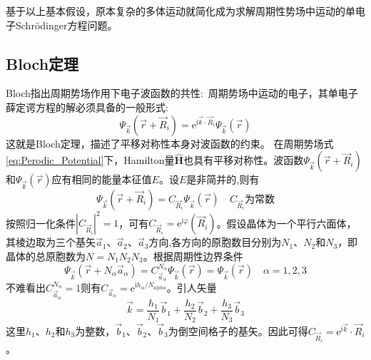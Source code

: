 基于以上基本假设，原本复杂的多体运动就简化成为求解周期性势场中运动的单电子Schr\"odinger方程问题。

\subsection{Bloch定理} 
Bloch指出\cite{ZP52-555_1928}周期势场作用下电子波函数的共性:~周期势场中运动的电子，其单电子薛定谔方程的解必须具备的一般形式:
\begin{equation}
	\Psi_{\vec k}(\vec r+\vec R_i)=\mathrm{e}^{\mathrm{i}\vec k\cdot\vec R_i}\Psi_{\vec k}(\vec r)
	\label{eq:Bloch_theorme}
\end{equation} 
这就是Bloch定理，描述了平移对称性本身对波函数的约束。%
在周期势场式\eqref{eq:Perodic_Potential}下，Hamilton量$\hat{\mathbf{H}}$也具有平移对称性。波函数$\Psi_{\vec k}(\vec r+\vec R_i)$和$\Psi_{\vec k}(\vec r)$应有相同的能量本征值$E$。设$E$是非简并的,则有
\begin{equation}
	\Psi_{\vec k}(\vec r+\vec R_i)=C_{\vec R_i}\Psi_{\vec k}(\vec r)\quad C_{\vec R_i}\mbox{为常数}
	\label{eq:Bloch_Theorme-1}
\end{equation}
按照归一化条件$|C_{\vec R_i}|^2=1$，可有$C_{\vec R_i}=\mathrm{e}^{\mathrm{i}\varphi}(\vec R_i)$。假设晶体为一个平行六面体，其棱边取为三个基矢$\vec a_1$、$\vec a_2$、$\vec a_3$方向,各方向的原胞数目分别为$N_1$、$N_2$和$N_3$，即晶体的总原胞数为$N=N_1N_2N_3$。根据周期性边界条件
\begin{equation}
	\Psi_{\vec k}(\vec r+N_{\alpha}\vec a_{\alpha})=C_{\vec a_{\alpha}}^{N_{\alpha}}\Psi_{\vec k}(\vec r)=\Psi_{\vec k}(\vec r)\quad\alpha=1,2,3
	\label{eq:Bloch_Therome-2}
\end{equation}
不难看出$C_{\vec a_{\alpha}}^{N_{\alpha}}=1$则有$C_{\vec a_{\alpha}}=\mathrm{e}^{\mathrm{i}h_{\alpha}/N_{alpha}}$。引人矢量
\begin{equation}
	\vec k=\dfrac{h_1}{N_1}\vec b_1+\dfrac{h_2}{N_2}\vec b_2+\dfrac{h_3}{N_3}\vec b_3
	\label{eq:Bloch_Therome-3}
\end{equation}
这里$h_1$、$h_2$和$h_3$为整数，$\vec b_1$、$\vec b_2$、$\vec b_3$为倒空间格子的基矢。因此可得$C_{\vec R_i}=\mathrm{e}^{\mathrm{i}\vec k}\cdot\vec R_i$。


